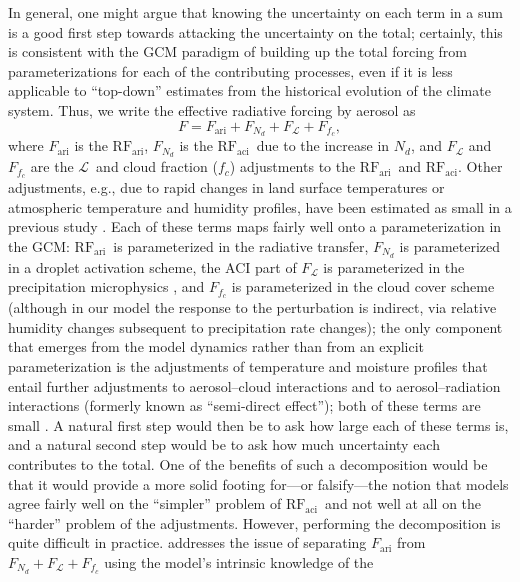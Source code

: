 \documentclass[acp, manuscript]{copernicus}\usepackage[]{graphicx}\usepackage[]{color}
\newcommand\nd{\ensuremath{N_d}}
\newcommand\lwp{\ensuremath{\mathcal L}}
\newcommand\fc{\ensuremath{f_c}}
\newcommand\cf{\fc}
\newcommand\rfaci{\ensuremath{\text{RF}_\text{aci}}}
\newcommand\rfari{\ensuremath{\text{RF}_\text{ari}}}
\begin{document}
In general, one might argue that knowing the uncertainty on each term in a sum
is a good first step towards attacking the uncertainty on the total; certainly,
this is consistent with the GCM paradigm of building up the total forcing from
parameterizations for each of the contributing processes, even if it is less
applicable to ``top-down'' estimates from the historical evolution of the
climate system.  Thus, we write the effective radiative forcing by aerosol
as
\begin{equation}
  \label{eq:f}
  F = F_\text{ari} + F_{\nd} + F_\lwp + F_{\cf},
\end{equation}
where $F_\text{ari}$ is the \rfari, $F_{\nd}$ is the \rfaci\ due to the increase
in \nd, and $F_\lwp$ and $F_{\cf}$ are the \lwp\ and cloud fraction (\cf)
adjustments to the \rfari\ and \rfaci.  Other adjustments, e.g., due to rapid
changes in land surface temperatures or atmospheric temperature and humidity
profiles, have been estimated as small in a previous study \citep{Heyn2017}.
Each of these terms maps fairly well onto a parameterization in the GCM: \rfari\
is parameterized in the radiative transfer, $F_{\nd}$ is parameterized in a
droplet activation scheme, the ACI part of $F_\lwp$ is parameterized in the
precipitation microphysics \citep[and, if enhanced evaporation becomes tractable
in the future, that component will presumably be parameterized in the turbulence
scheme; e.g.,][]{Guo2011,Neubauer2014}, and $F_{\cf}$ is parameterized in the
cloud cover scheme (although in our model the response to the perturbation is
indirect, via relative humidity changes subsequent to precipitation rate
changes); the only component that emerges from the model dynamics rather than
from an explicit parameterization is the adjustments of temperature and moisture
profiles that entail further adjustments to aerosol--cloud interactions and to
aerosol--radiation interactions (formerly known as ``semi-direct effect''); both
of these terms are small \citep{Heyn2017,Stjern2017}.  A natural first step
would then be to ask how large each of these terms is, and a natural second step
would be to ask how much uncertainty each contributes to the total.  One of the
benefits of such a decomposition would be that it would provide a more solid
footing for---or falsify---the notion that models agree fairly well on the
``simpler'' problem of \rfaci\ and not well at all on the ``harder'' problem of
the adjustments.  However, performing the decomposition is quite difficult in
practice.  \citet{Ghan2013} addresses the issue of separating $F_\text{ari}$
from $F_{\nd} + F_\lwp + F_{\cf}$ using the model's intrinsic knowledge of the
\end{document}
